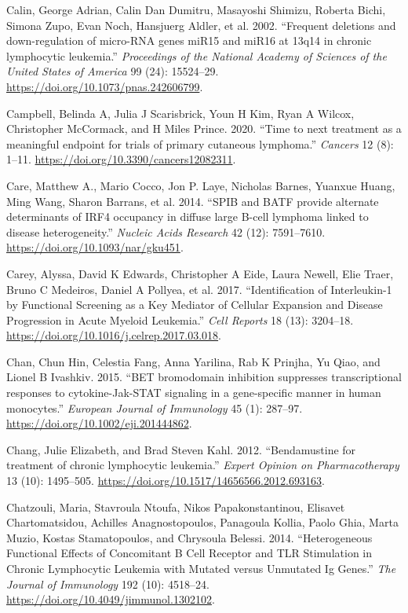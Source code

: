 \documentclass[11pt, a4paper, twosided]{book}
\newenvironment{CSLReferences}%
  {}%
  {\par}
\begin{document}
\begin{CSLReferences}{1}{0}
\leavevmode{}%
Calin, George Adrian, Calin Dan Dumitru, Masayoshi Shimizu, Roberta Bichi, Simona Zupo, Evan Noch, Hansjuerg Aldler, et al. 2002. {``{Frequent deletions and down-regulation of micro-RNA genes miR15 and miR16 at 13q14 in chronic lymphocytic leukemia}.''} \emph{Proceedings of the National Academy of Sciences of the United States of America} 99 (24): 15524--29. \url{https://doi.org/10.1073/pnas.242606799}.

\leavevmode{}%
Campbell, Belinda A, Julia J Scarisbrick, Youn H Kim, Ryan A Wilcox, Christopher McCormack, and H Miles Prince. 2020. {``{Time to next treatment as a meaningful endpoint for trials of primary cutaneous lymphoma}.''} \emph{Cancers} 12 (8): 1--11. \url{https://doi.org/10.3390/cancers12082311}.

\leavevmode{}%
Care, Matthew A., Mario Cocco, Jon P. Laye, Nicholas Barnes, Yuanxue Huang, Ming Wang, Sharon Barrans, et al. 2014. {``{SPIB and BATF provide alternate determinants of IRF4 occupancy in diffuse large B-cell lymphoma linked to disease heterogeneity}.''} \emph{Nucleic Acids Research} 42 (12): 7591--7610. \url{https://doi.org/10.1093/nar/gku451}.

\leavevmode{}%
Carey, Alyssa, David K Edwards, Christopher A Eide, Laura Newell, Elie Traer, Bruno C Medeiros, Daniel A Pollyea, et al. 2017. {``{Identification of Interleukin-1 by Functional Screening as a Key Mediator of Cellular Expansion and Disease Progression in Acute Myeloid Leukemia}.''} \emph{Cell Reports} 18 (13): 3204--18. \url{https://doi.org/10.1016/j.celrep.2017.03.018}.

\leavevmode{}%
Chan, Chun Hin, Celestia Fang, Anna Yarilina, Rab K Prinjha, Yu Qiao, and Lionel B Ivashkiv. 2015. {``{BET bromodomain inhibition suppresses transcriptional responses to cytokine-Jak-STAT signaling in a gene-specific manner in human monocytes.}''} \emph{European Journal of Immunology} 45 (1): 287--97. \url{https://doi.org/10.1002/eji.201444862}.

\leavevmode{}%
Chang, Julie Elizabeth, and Brad Steven Kahl. 2012. {``{Bendamustine for treatment of chronic lymphocytic leukemia}.''} \emph{Expert Opinion on Pharmacotherapy} 13 (10): 1495--505. \url{https://doi.org/10.1517/14656566.2012.693163}.

\leavevmode{}%
Chatzouli, Maria, Stavroula Ntoufa, Nikos Papakonstantinou, Elisavet Chartomatsidou, Achilles Anagnostopoulos, Panagoula Kollia, Paolo Ghia, Marta Muzio, Kostas Stamatopoulos, and Chrysoula Belessi. 2014. {``{Heterogeneous Functional Effects of Concomitant B Cell Receptor and TLR Stimulation in Chronic Lymphocytic Leukemia with Mutated versus Unmutated Ig Genes}.''} \emph{The Journal of Immunology} 192 (10): 4518--24. \url{https://doi.org/10.4049/jimmunol.1302102}.


\end{CSLReferences}
\end{document}
